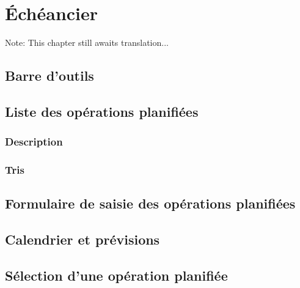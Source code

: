 
\chapter{Échéancier\label{plannedtransactions}}

Note: This chapter still awaits translation...


\section{Barre d'outils\label{plannedtransactions-functions}}


\section{Liste des opérations planifiées\label{plannedtransactions-list}}


\subsection{Description\label{plannedtransactions-list-description}}


\subsection{Tris\label{plannedtransactions-list-sorts}}

\section{Formulaire de saisie des opérations planifiées\label{plannedtransactions-form}}


\section{Calendrier et prévisions\label{plannedtransactions-calendar}}


\section{Sélection d'une opération planifiée\label{plannedtransactions-selection}}


